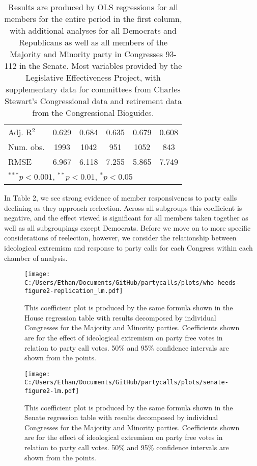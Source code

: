 \documentclass[12pt]{article}
\newcommand\fnote[1]{\captionsetup{font=small}\caption*{#1}}
\begin{document}
\begin{table}[H]
\begin{center}
\begin{tabular}{l c c c c c }
			Adj. R$^2$             & 0.629          & 0.684         & 0.635          & 0.679          & 0.608         \\
			Num. obs.              & 1993           & 1042          & 951            & 1052           & 843           \\
			RMSE                   & 6.967          & 6.118         & 7.255          & 5.865          & 7.749         \\
			\hline
			\multicolumn{6}{l}{\scriptsize{$^{***}p<0.001$, $^{**}p<0.01$, $^*p<0.05$}}
		\end{tabular}
	\fnote{Results are produced by OLS regressions for all members for the entire period in the first column, with additional analyses for all Democrats and Republicans as well as all members of the Majority and Minority party in Congresses 93-112 in the Senate. Most variables provided by the Legislative Effectiveness Project, with supplementary data for committees from Charles Stewart's Congressional data and retirement data from the Congressional Bioguides.}
	\end{center}
\end{table}

In Table 2, we see strong evidence of member responsiveness to party calls declining as they approach reelection. Across all subgroups this coefficient is negative, and the effect viewed is significant for all members taken together as well as all subgroupings except Democrats. Before we move on to more specific considerations of reelection, however, we consider the relationship between ideological extremism and response to party calls for each Congress within each chamber of analysis.

\begin{figure}[H]
	\centering
	\caption{House Ideological Extremism Coefficient Plot}
	\texttt{[image: C:/Users/Ethan/Documents/GitHub/partycalls/plots/who-heeds-figure2-replication\_lm.pdf]}
	\fnote{This coefficient plot is produced by the same formula shown in the House regression table with results decomposed by individual Congresses for the Majority and Minority parties. Coefficients shown are for the effect of ideological extremism on party free votes in relation to party call votes. 50\% and 95\% confidence intervals are shown from the points.}
\end{figure}

\begin{figure}[H]
	\centering
	\caption{Senate Ideological Extremism Coefficient Plot}
	\texttt{[image: C:/Users/Ethan/Documents/GitHub/partycalls/plots/senate-figure2-lm.pdf]}
	\fnote{This coefficient plot is produced by the same formula shown in the Senate regression table with results decomposed by individual Congresses for the Majority and Minority parties. Coefficients shown are for the effect of ideological extremism on party free votes in relation to party call votes. 50\% and 95\% confidence intervals are shown from the points.}
\end{figure}
\end{document}

